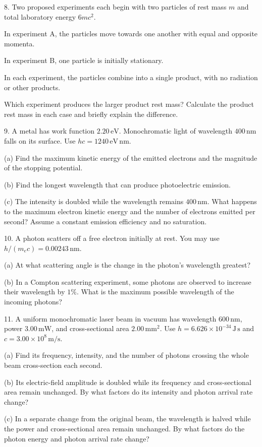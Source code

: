 \documentclass[12pt,letterpaper]{article}
\begin{document}
\vfill
\newpage

8. Two proposed experiments each begin with two particles of rest mass $m$ and total laboratory energy $6mc^2$.

In experiment A, the particles move towards one another with equal and opposite momenta.

In experiment B, one particle is initially stationary.

In each experiment, the particles combine into a single product, with no radiation or other products.

Which experiment produces the larger product rest mass? Calculate the product rest mass in each case and briefly explain the difference.

\vfill
\newpage

9. A metal has work function $2.20\,\mathrm{eV}$. Monochromatic light of wavelength $400\,\mathrm{nm}$ falls on its surface. Use $hc=1240\,\mathrm{eV\,nm}$.

(a) Find the maximum kinetic energy of the emitted electrons and the magnitude of the stopping potential.

\vfill

(b) Find the longest wavelength that can produce photoelectric emission.

\vfill

(c) The intensity is doubled while the wavelength remains $400\,\mathrm{nm}$. What happens to the maximum electron kinetic energy and the number of electrons emitted per second? Assume a constant emission efficiency and no saturation.

\vfill
\newpage

10. A photon scatters off a free electron initially at rest. You may use $h/(m_ec)=0.00243\,\mathrm{nm}$.

(a) At what scattering angle is the change in the photon's wavelength greatest?

\vfill

(b) In a Compton scattering experiment, some photons are observed to increase their wavelength by $1\%$. What is the maximum possible wavelength of the incoming photons?

\vfill
\newpage

11. A uniform monochromatic laser beam in vacuum has wavelength $600\,\mathrm{nm}$, power $3.00\,\mathrm{mW}$, and cross-sectional area $2.00\,\mathrm{mm}^2$. Use $h=6.626\times10^{-34}\,\mathrm{J\,s}$ and $c=3.00\times10^8\,\mathrm{m/s}$.

(a) Find its frequency, intensity, and the number of photons crossing the whole beam cross-section each second.

\vfill

(b) Its electric-field amplitude is doubled while its frequency and cross-sectional area remain unchanged. By what factors do its intensity and photon arrival rate change?

\vfill

(c) In a separate change from the original beam, the wavelength is halved while the power and cross-sectional area remain unchanged. By what factors do the photon energy and photon arrival rate change?

\vfill
\end{document}

